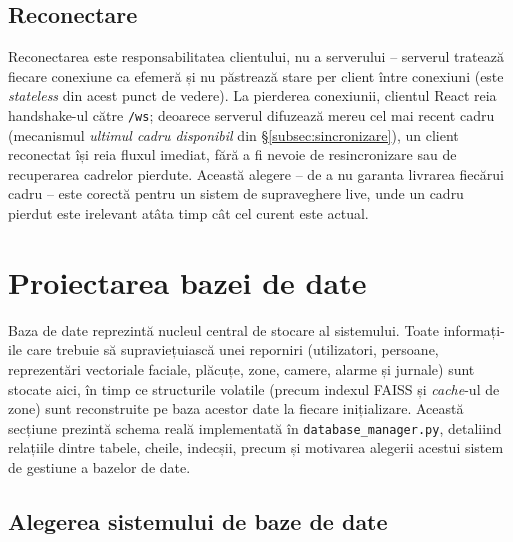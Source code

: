 \documentclass[../../main.tex]{subfiles}
\begin{document}
\subsection{Reconectare}

Reconectarea este responsabilitatea clientului, nu a serverului -- serverul tratează fiecare conexiune ca efemeră și nu păstrează stare per client între conexiuni (este \emph{stateless} din acest punct de vedere). La pierderea conexiunii, clientul React reia handshake-ul către \texttt{/ws}; deoarece serverul difuzează mereu cel mai recent cadru (mecanismul \emph{ultimul cadru disponibil} din \S\ref{subsec:sincronizare}), un client reconectat își reia fluxul imediat, fără a fi nevoie de resincronizare sau de recuperarea cadrelor pierdute. Această alegere -- de a nu garanta livrarea fiecărui cadru -- este corectă pentru un sistem de supraveghere live, unde un cadru pierdut este irelevant atâta timp cât cel curent este actual.

\section{Proiectarea bazei de date}
\label{sec:proiectare_db}

Baza de date reprezintă nucleul central de stocare al sistemului. Toate informați-ile care trebuie să supraviețuiască unei reporniri (utilizatori, persoane, reprezentări vectoriale faciale, plăcuțe, zone, camere, alarme și jurnale) sunt stocate aici, în timp ce structurile volatile (precum indexul FAISS și \emph{cache}-ul de zone) sunt reconstruite pe baza acestor date la fiecare inițializare. Această secțiune prezintă schema reală implementată în \texttt{database\_manager.py}, detaliind relațiile dintre tabele, cheile, indecșii, precum și motivarea alegerii acestui sistem de gestiune a bazelor de date.

\subsection{Alegerea sistemului de baze de date}
\end{document}
